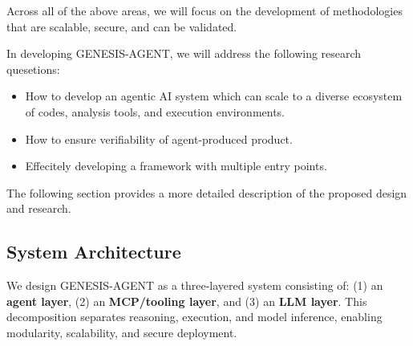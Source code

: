 \documentclass[11pt]{article} \usepackage[margin=1in]{geometry}
\begin{document}
Across all of the above areas, we will focus on the development of methodologies
that are scalable, secure, and can be validated.
  

In developing GENESIS-AGENT, we will address the following research quesetions:
\begin{itemize}
\item How to develop an agentic AI system which can scale to a diverse ecosystem
of codes, analysis tools, and execution environments.
\item How to ensure verifiability of agent-produced product.
\item Effecitely developing a framework with multiple entry points.
\end{itemize}

The following section provides a more detailed description of the proposed
design and research.
 
\subsection*{System Architecture}
We design GENESIS-AGENT as a three-layered system consisting of: (1) an
\textbf{agent layer}, (2) an \textbf{MCP/tooling layer}, and (3) an \textbf{LLM
layer}. This decomposition separates reasoning, execution, and model inference,
enabling modularity, scalability, and secure deployment.
\end{document}
